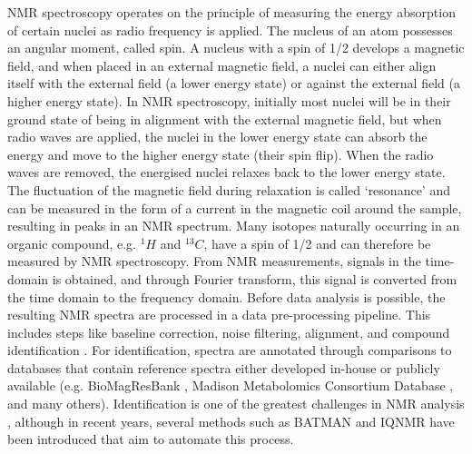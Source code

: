 NMR spectroscopy operates on the principle of measuring the energy absorption of certain nuclei as radio frequency is applied. The nucleus of an atom possesses an angular moment, called spin. A nucleus with a spin of 1/2 develops a magnetic field, and when placed in an external magnetic field, a nuclei can either align itself with the external field (a lower energy state) or against the external field (a higher energy state). In NMR spectroscopy, initially most nuclei will be in their ground state of being in alignment with the external magnetic field, but when radio waves are applied, the nuclei in the lower energy state can absorb the energy and move to the higher energy state (their spin flip). When the radio waves are removed, the energised nuclei relaxes back to the lower energy state. The fluctuation of the magnetic field during relaxation is called `resonance' and can be measured in the form of a current in the magnetic coil around the sample, resulting in peaks in an NMR spectrum. Many isotopes naturally occurring in an organic compound, e.g. $^{1}H$ and $^{13}C$,  have a spin of 1/2 and can therefore be measured by NMR spectroscopy. From NMR measurements, signals in the time-domain is obtained, and through Fourier transform, this signal is converted from the time domain to the frequency domain. Before data analysis is possible, the resulting NMR spectra are processed in a data pre-processing pipeline. This includes steps like baseline correction, noise filtering, alignment, and compound identification \cite{Alonso2015}. For identification, spectra are annotated through comparisons to databases that contain reference spectra either developed in-house or publicly available (e.g. BioMagResBank \cite{Ulrich01012008}, Madison Metabolomics Consortium Database \cite{cui2008metabolite}, and many others). Identification is one of the greatest challenges in NMR analysis \cite{Pan2007}, although in recent years, several methods such as BATMAN \cite{hao2012batman} and IQNMR \cite{song2011iqmnmr} have been introduced that aim to automate this process.


